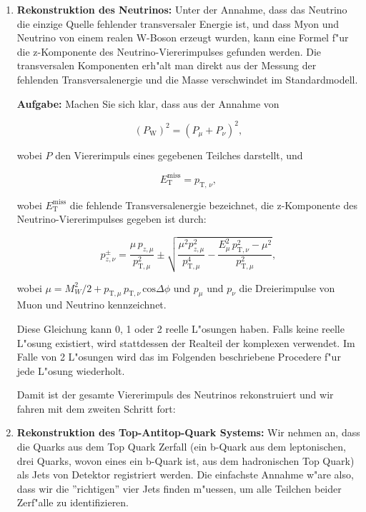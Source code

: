 \begin{enumerate}
\item \textbf{Rekonstruktion des Neutrinos:} Unter der Annahme, dass das Neutrino die einzige Quelle fehlender transversaler Energie ist, und dass Myon und Neutrino von einem realen W-Boson erzeugt wurden, kann eine Formel f"ur die z-Komponente des Neutrino-Viererimpulses gefunden werden. Die transversalen Komponenten erh"alt man direkt aus der Messung der fehlenden Transversalenergie und die Masse verschwindet im Standardmodell. 

\textbf{Aufgabe:} Machen Sie sich klar, dass aus der Annahme von 

\begin{equation}
\left(P_{\text{W}}\right)^2 = \left(P_{\mu} + P_{\nu}\right)^2,
\end{equation}

\noindent wobei $P$ den Viererimpuls eines gegebenen Teilches darstellt, und 

\begin{equation}
E_{\text{T}}^{\text{miss}} = p_{\text{T, }\nu},
\end{equation}

\noindent wobei $E_{\text{T}}^{\text{miss}}$ die fehlende Transversalenergie bezeichnet, die z-Komponente des Neutrino-Viererimpulses gegeben ist durch: 

\begin{equation}
p_{z,\nu}^\pm = \frac{\mu\,p_{z,\mu}}{p_{\text{T},\mu}^2} \pm \sqrt{\frac{\mu^2p_{z,\mu}^2}{p_{\text{T},\mu}^4}-\frac{E_\mu^2\,p_{\text{T},\nu}^2-\mu^2}{p_{\text{T},\mu}^2}},
\end{equation}

\noindent wobei $\mu = M_W^2 / 2 + p_{\text{T},\mu}\,p_{\text{T},\nu}\,\text{cos}\Delta\phi$ und $p_{\mu}$ und $p_{\nu}$ die Dreierimpulse von Muon und Neutrino kennzeichnet.

Diese Gleichung kann 0, 1 oder 2 reelle L"osungen haben. Falls keine reelle L"osung existiert, wird stattdessen der Realteil der komplexen verwendet. Im Falle von 2 L"osungen wird das im Folgenden beschriebene Procedere f"ur jede L"osung wiederholt.

Damit ist der gesamte Viererimpuls des Neutrinos rekonstruiert und wir fahren mit dem zweiten Schritt fort:

\item \textbf{Rekonstruktion des Top-Antitop-Quark Systems:} Wir nehmen an, dass die Quarks aus dem Top Quark Zerfall (ein b-Quark aus dem leptonischen, drei Quarks, wovon eines ein b-Quark ist, aus dem hadronischen Top Quark) als Jets von Detektor registriert werden. Die einfachste Annahme w"are also, dass wir die ''richtigen'' vier Jets finden m"uessen, um alle Teilchen beider Zerf"alle zu identifizieren. 


\end{enumerate}

